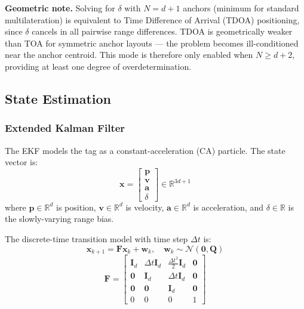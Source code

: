 \documentclass[11pt,a4paper]{article}
\newcommand{\vect}[1]{\bm{#1}}
\newcommand{\mat}[1]{\mathbf{#1}}
\newcommand{\R}{\mathbb{R}}
\begin{document}
\begin{notebox}
\textbf{Geometric note.} Solving for $\delta$ with $N = d+1$ anchors (minimum for standard multilateration) is equivalent to Time Difference of Arrival (TDOA) positioning, since $\delta$ cancels in all pairwise range differences. TDOA is geometrically weaker than TOA for symmetric anchor layouts — the problem becomes ill-conditioned near the anchor centroid. This mode is therefore only enabled when $N \geq d+2$, providing at least one degree of overdetermination.
\end{notebox}

\subsection{State Estimation}

\subsubsection{Extended Kalman Filter}

The EKF models the tag as a constant-acceleration (CA) particle. The state vector is:
\begin{equation}
\vect{x} = \begin{bmatrix} \vect{p} \\ \vect{v} \\ \vect{a} \\ \delta \end{bmatrix} \in \R^{3d+1}
\end{equation}
where $\vect{p} \in \R^d$ is position, $\vect{v} \in \R^d$ is velocity, $\vect{a} \in \R^d$ is acceleration, and $\delta \in \R$ is the slowly-varying range bias.

The discrete-time transition model with time step $\Delta t$ is:
\begin{equation}
\vect{x}_{k+1} = \mat{F} \vect{x}_k + \vect{w}_k, \quad \vect{w}_k \sim \mathcal{N}(\vect{0}, \mat{Q})
\end{equation}
\begin{equation}
\mat{F} = \begin{bmatrix}
\mat{I}_d & \Delta t \mat{I}_d & \tfrac{\Delta t^2}{2}\mat{I}_d & \vect{0} \\
\mat{0}   & \mat{I}_d         & \Delta t \mat{I}_d              & \vect{0} \\
\mat{0}   & \mat{0}           & \mat{I}_d                       & \vect{0} \\
0         & 0                 & 0                               & 1
\end{bmatrix}
\end{equation}
\end{document}
